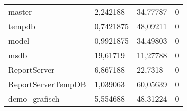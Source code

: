           \begin{center}
            \begin{small}
              \tablehead{}
              \tabletail {
              }
              \tablelasttail {
              }
              \begin{mssql}
                \begin{supertabular}{llll}
                  master             & 2,242188  & 34,77787 & 0 \\
                  tempdb             & 0,7421875 & 48,09211 & 0 \\
                  model              & 0,9921875 & 34,49803 & 0 \\
                  msdb               & 19,61719  & 11,27788 & 0 \\
                  ReportServer       & 6,867188  & 22,7318  & 0 \\
                  ReportServerTempDB & 1,039063  & 60,05639 & 0 \\
                  demo\_grafisch     & 5,554688  & 48,31224 & 0 \\
                \end{supertabular}
              \end{mssql}
            \end{small}
          \end{center}
          \begin{literaturinternet}
            \item \cite{ms189768}
          \end{literaturinternet}
